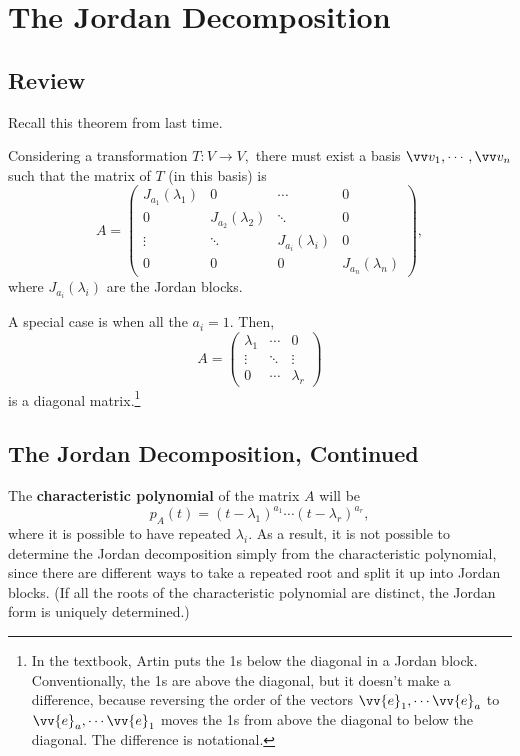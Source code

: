 
\section{The Jordan Decomposition}
\subsection{Review}
Recall this theorem from last time.

\begin{theorem}
Considering a transformation $T: V \rightarrow V,$ there must exist a basis $\vvv_1, \cdots, \vvv_n$ such that the matrix of $T$ (in this basis) is 
\[
A = \begin{pmatrix}
J_{a_1}(\lambda_1) & 0 & \cdots & 0 \\
0 & J_{a_2}(\lambda_2) & \ddots & 0 \\
\vdots & \ddots  & J_{a_i}(\lambda_i) & 0 \\

0 & 0 & 0 & J_{a_n}(\lambda_n)
\end{pmatrix},
\]
where $J_{a_i}(\lambda_i)$ are the Jordan blocks.
\end{theorem}

A special case is when all the $a_i = 1.$ Then, 
\[
A = \begin{pmatrix}
\lambda_1 & \cdots & 0 \\
\vdots & \ddots & \vdots \\
0 & \cdots & \lambda_r
\end{pmatrix}
\]
is a diagonal matrix.\footnote{In the textbook, Artin puts the 1s below the diagonal in a Jordan block. Conventionally, the 1s are above the diagonal, but it doesn't make a difference, because reversing the order of the vectors $\vv{e}_1, \cdots \vv{e}_a$ to $\vv{e}_a, \cdots \vv{e}_1$ moves the 1s from above the diagonal to below the diagonal. The difference is notational.}

\subsection{The Jordan Decomposition, Continued}

The \textbf{characteristic polynomial} of the matrix $A$ will be 
\[
p_A(t) = (t-\lambda_1)^{a_1} \cdots (t - \lambda_r)^{a_r},
\]
where it is possible to have repeated $\lambda_i.$ As a result, it is not possible to determine the Jordan decomposition simply from the characteristic polynomial, since there are different ways to take a repeated root and split it up into Jordan blocks. (If all the roots of the characteristic polynomial are distinct, the Jordan form is uniquely determined.) 

